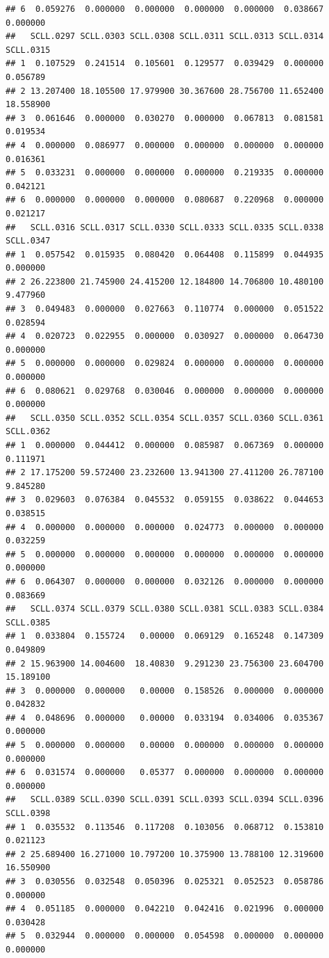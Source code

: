 \documentclass[
]{article}
\begin{document}
\begin{verbatim}
## 6  0.059276  0.000000  0.000000  0.000000  0.000000  0.038667  0.000000
##   SCLL.0297 SCLL.0303 SCLL.0308 SCLL.0311 SCLL.0313 SCLL.0314 SCLL.0315
## 1  0.107529  0.241514  0.105601  0.129577  0.039429  0.000000  0.056789
## 2 13.207400 18.105500 17.979900 30.367600 28.756700 11.652400 18.558900
## 3  0.061646  0.000000  0.030270  0.000000  0.067813  0.081581  0.019534
## 4  0.000000  0.086977  0.000000  0.000000  0.000000  0.000000  0.016361
## 5  0.033231  0.000000  0.000000  0.000000  0.219335  0.000000  0.042121
## 6  0.000000  0.000000  0.000000  0.080687  0.220968  0.000000  0.021217
##   SCLL.0316 SCLL.0317 SCLL.0330 SCLL.0333 SCLL.0335 SCLL.0338 SCLL.0347
## 1  0.057542  0.015935  0.080420  0.064408  0.115899  0.044935  0.000000
## 2 26.223800 21.745900 24.415200 12.184800 14.706800 10.480100  9.477960
## 3  0.049483  0.000000  0.027663  0.110774  0.000000  0.051522  0.028594
## 4  0.020723  0.022955  0.000000  0.030927  0.000000  0.064730  0.000000
## 5  0.000000  0.000000  0.029824  0.000000  0.000000  0.000000  0.000000
## 6  0.080621  0.029768  0.030046  0.000000  0.000000  0.000000  0.000000
##   SCLL.0350 SCLL.0352 SCLL.0354 SCLL.0357 SCLL.0360 SCLL.0361 SCLL.0362
## 1  0.000000  0.044412  0.000000  0.085987  0.067369  0.000000  0.111971
## 2 17.175200 59.572400 23.232600 13.941300 27.411200 26.787100  9.845280
## 3  0.029603  0.076384  0.045532  0.059155  0.038622  0.044653  0.038515
## 4  0.000000  0.000000  0.000000  0.024773  0.000000  0.000000  0.032259
## 5  0.000000  0.000000  0.000000  0.000000  0.000000  0.000000  0.000000
## 6  0.064307  0.000000  0.000000  0.032126  0.000000  0.000000  0.083669
##   SCLL.0374 SCLL.0379 SCLL.0380 SCLL.0381 SCLL.0383 SCLL.0384 SCLL.0385
## 1  0.033804  0.155724   0.00000  0.069129  0.165248  0.147309  0.049809
## 2 15.963900 14.004600  18.40830  9.291230 23.756300 23.604700 15.189100
## 3  0.000000  0.000000   0.00000  0.158526  0.000000  0.000000  0.042832
## 4  0.048696  0.000000   0.00000  0.033194  0.034006  0.035367  0.000000
## 5  0.000000  0.000000   0.00000  0.000000  0.000000  0.000000  0.000000
## 6  0.031574  0.000000   0.05377  0.000000  0.000000  0.000000  0.000000
##   SCLL.0389 SCLL.0390 SCLL.0391 SCLL.0393 SCLL.0394 SCLL.0396 SCLL.0398
## 1  0.035532  0.113546  0.117208  0.103056  0.068712  0.153810  0.021123
## 2 25.689400 16.271000 10.797200 10.375900 13.788100 12.319600 16.550900
## 3  0.030556  0.032548  0.050396  0.025321  0.052523  0.058786  0.000000
## 4  0.051185  0.000000  0.042210  0.042416  0.021996  0.000000  0.030428
## 5  0.032944  0.000000  0.000000  0.054598  0.000000  0.000000  0.000000

\end{verbatim}
\end{document}
